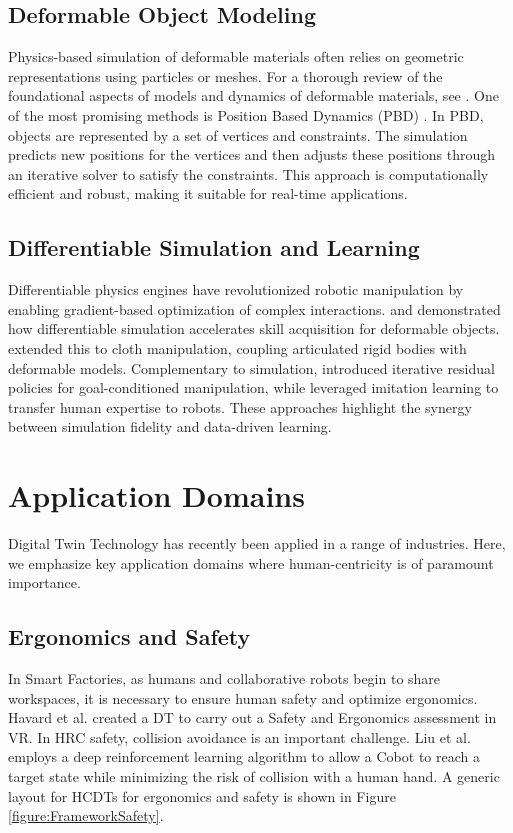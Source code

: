 \subsection{Deformable Object Modeling}
Physics-based simulation of deformable materials often relies on geometric representations using particles or meshes. For a thorough review of the foundational aspects of models and dynamics of deformable materials, see \cite{ModelDeformReview}. One of the most promising methods is Position Based Dynamics (PBD) \cite{PBD}. In PBD, objects are represented by a set of vertices and constraints. The simulation predicts new positions for the vertices and then adjusts these positions through an iterative solver to satisfy the constraints. This approach is computationally efficient and robust, making it suitable for real-time applications.

\subsection{Differentiable Simulation and Learning}
Differentiable physics engines have revolutionized robotic manipulation by enabling gradient-based optimization of complex interactions. \cite{Li2023} and \cite{Lin2022} demonstrated how differentiable simulation accelerates skill acquisition for deformable objects. \cite{Liu2023} extended this to cloth manipulation, coupling articulated rigid bodies with deformable models. Complementary to simulation, \cite{Chi2022} introduced iterative residual policies for goal-conditioned manipulation, while \cite{Salhotra2022} leveraged imitation learning to transfer human expertise to robots. These approaches highlight the synergy between simulation fidelity and data-driven learning.

\section{Application Domains}
Digital Twin Technology has recently been applied in a range of industries. Here, we emphasize key application domains where human-centricity is of paramount importance.

\subsection{Ergonomics and Safety}
In Smart Factories, as humans and collaborative robots begin to share workspaces, it is necessary to ensure human safety and optimize ergonomics. Havard et al. \cite{Havard2019} created a DT to carry out a Safety and Ergonomics assessment in VR. In HRC safety, collision avoidance is an important challenge. Liu et al. \cite{Liu2021} employs a deep reinforcement learning algorithm to allow a Cobot to reach a target state while minimizing the risk of collision with a human hand. A generic layout for HCDTs for ergonomics and safety is shown in Figure \ref{figure:FrameworkSafety}.

